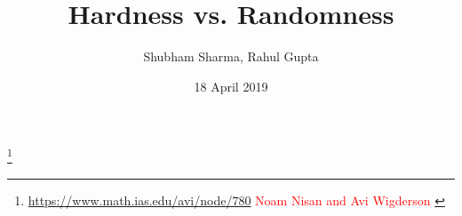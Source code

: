 \documentclass[xcolor={table,dvipsnames,usenames}]{beamer}
\title{Hardness vs. Randomness}
\author{Shubham Sharma\inst{*},
	Rahul Gupta\inst{*} 
	}
\institute[Universities of Somewhere and Elsewhere] %
{
  \inst{*}%
  Indian Institute of Technology Kanpur, India}
\date{18 April 2019}
\begin{document}
\newcommand{\ddnnf}{\ensuremath{\mathsf{dag}}}
\newcommand{\Poly}{\ensuremath{\mathsf{P}}}
\newcommand{\NP}{\ensuremath{\mathsf{NP}}}
\newcommand{\WAPS}{\ensuremath{\mathsf{WAPS}}}
\newcommand{\KUS}{\ensuremath{\mathsf{KUS}}}
\newcommand{\DSPACE}{\ensuremath{\mathsf{DSPACE}}}
\newcommand{\EXPTIME}{\ensuremath{\mathsf{EXPTIME}}}
\newcommand{\RNC}{\ensuremath{\mathsf{RNC}}}
\newcommand{\BPP}{\ensuremath{\mathsf{BPP}}}
\newcommand{\DTIME}{\ensuremath{\mathsf{DTIME}}}
\newcommand{\RTIME}{\ensuremath{\mathsf{RTIME}}}
\newcommand{\WeightGen}{\ensuremath{\mathsf{WeightGen}}}
\newcommand{\prob}{\ensuremath{\mathsf{Pr}}}
\newcommand{\UniGen}{\ensuremath{\mathsf{UniGen2}}}
\newcommand{\satisfying}[1]{\ensuremath{R_{#1}}} %
\newcommand{\satisfyingv}[2]{\ensuremath{R_{#1\downarrow #2}}}
\newcommand{\Sampler}{\ensuremath{\mathsf{Sampler}}}
\newcommand{\sampleList}{\ensuremath{\mathsf{SampleList}}}
\newcommand{\Shuffle}{\ensuremath{\mathsf{Shuffle}}}
\newcommand{\Append}{\ensuremath{\mathsf{Append}}}
\newcommand{\Stitch}{\ensuremath{\mathsf{Stitch}}}
\newcommand{\IS}{\ensuremath{\mathsf{IS}}}
\newcommand{\normalize}{\ensuremath{\mathsf{Normalize}}}
\newcommand{\WCounter}{\ensuremath{\mathsf{WAnnotate}}}
\newcommand{\PCompile}{\ensuremath{\mathsf{PCompile}}}


\begin{frame}
  \titlepage
  \begin{center}
  	\footnote{\href{https://www.math.ias.edu/avi/node/780}{https://www.math.ias.edu/avi/node/780} \textcolor{red}{Noam Nisan and Avi Wigderson }}
  \end{center}
  
\end{frame}
\end{document}
